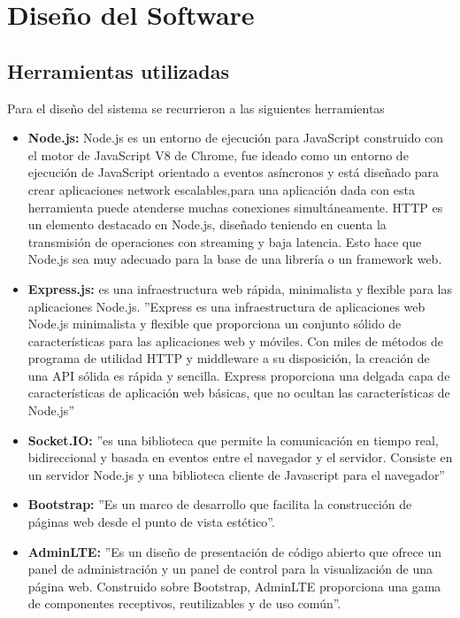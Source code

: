 \chapter[Capítulo 5. Diseño del Software]{Diseño del Software}

\section {Herramientas utilizadas}
Para el diseño del sistema se recurrieron a las siguientes herramientas 
\begin{itemize}
	\item {\bfseries Node.js: }	Node.js es un entorno de ejecución para JavaScript construido con el motor de JavaScript V8 de Chrome, fue ideado como un entorno de ejecución de JavaScript orientado a eventos asíncronos y está diseñado para crear aplicaciones network escalables,para una aplicación dada con esta herramienta puede atenderse muchas conexiones simultáneamente.
	HTTP es un elemento destacado en Node.js, diseñado teniendo en cuenta la transmisión de operaciones con streaming y baja latencia. Esto hace que Node.js sea muy adecuado para la base de una librería o un framework web.
	\item {\bfseries Express.js: } es una infraestructura web rápida, minimalista y flexible para las aplicaciones Node.js. ''Express es una infraestructura de aplicaciones web Node.js minimalista y flexible que proporciona un conjunto sólido de características para las aplicaciones web y móviles. 	Con miles de métodos de programa de utilidad HTTP y middleware a su disposición, la creación de una API sólida es rápida y sencilla. Express proporciona una delgada capa de características de aplicación web básicas, que no ocultan las características de Node.js'' %
	\item {\bfseries Socket.IO: } ''es una biblioteca que permite la comunicación en tiempo real, bidireccional y basada en eventos entre el navegador y el servidor. Consiste en  un servidor Node.js y una biblioteca cliente de Javascript para el navegador'' %
	\item {\bfseries Bootstrap: } ''Es un marco de desarrollo que facilita la construcción de páginas web desde el punto de vista estético''. %
	\item {\bfseries AdminLTE: } ''Es un diseño de presentación  de código abierto que ofrece un  panel de administración y  un panel de control para la visualización de una página web. Construido sobre Bootstrap, AdminLTE proporciona una gama de componentes receptivos, reutilizables y de uso común''. %
	

\end{itemize}
